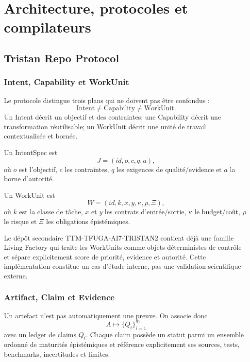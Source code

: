 \part{Architecture, protocoles et compilateurs}

\chapter{Tristan Repo Protocol}

\section{Intent, Capability et WorkUnit}

Le protocole distingue trois plans qui ne doivent pas être confondus :
\[
\mathrm{Intent}\neq\mathrm{Capability}\neq\mathrm{WorkUnit}.
\]
Un Intent décrit un objectif et des contraintes; une Capability décrit une transformation réutilisable; un WorkUnit décrit une unité de travail contextualisée et bornée.

\begin{definition}[IntentSpec]
Un IntentSpec est
\[
J=(id,o,c,q,a),
\]
où $o$ est l'objectif, $c$ les contraintes, $q$ les exigences de qualité/evidence et $a$ la borne d'autorité.
\end{definition}

\begin{definition}[WorkUnit]
Un WorkUnit est
\[
W=(id,k,x,y,\kappa,\rho,\Xi),
\]
où $k$ est la classe de tâche, $x$ et $y$ les contrats d'entrée/sortie, $\kappa$ le budget/coût, $\rho$ le risque et $\Xi$ les obligations épistémiques.
\end{definition}

Le dépôt secondaire TTM-TFUGA-AI7-TRISTAN2 contient déjà une famille Living Factory qui traite les WorkUnits comme objets déterministes de contrôle et sépare explicitement score de priorité, evidence et autorité. Cette implémentation constitue un cas d'étude interne, pas une validation scientifique externe.

\section{Artifact, Claim et Evidence}

Un artefact n'est pas automatiquement une preuve. On associe donc
\[
A\mapsto\{Q_i\}_{i=1}^m
\]
avec un ledger de claims $Q_i$. Chaque claim possède un statut parmi un ensemble ordonné de maturités épistémiques et référence explicitement ses sources, tests, benchmarks, incertitudes et limites.

